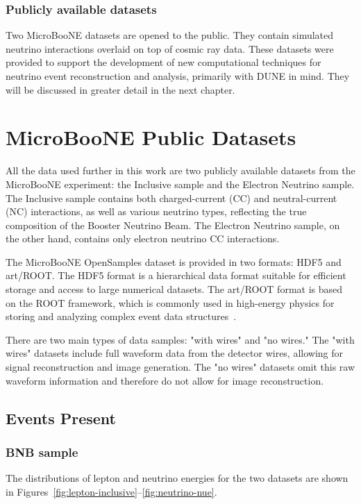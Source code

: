 \documentclass{pracalicmgr}
\begin{document}
\subsection{Publicly available datasets}

Two MicroBooNE datasets are opened to the public. They contain simulated neutrino interactions overlaid on top of cosmic ray data. These datasets were provided to support the development of new computational techniques for neutrino event reconstruction and analysis, primarily with DUNE in mind. They will be discussed in greater detail in the next chapter.

\chapter{MicroBooNE Public Datasets}

All the data used further in this work are two publicly available datasets from the MicroBooNE experiment: the Inclusive sample and the Electron Neutrino sample. The Inclusive sample contains both charged-current (CC) and neutral-current (NC) interactions, as well as various neutrino types, reflecting the true composition of the Booster Neutrino Beam. The Electron Neutrino sample, on the other hand, contains only electron neutrino CC interactions.

The MicroBooNE OpenSamples dataset is provided in two formats: HDF5 and art/ROOT. The HDF5 format is a hierarchical data format suitable for efficient storage and access to large numerical datasets. The art/ROOT format is based on the ROOT framework, which is commonly used in high-energy physics for storing and analyzing complex event data structures~\cite{hdf5,root}. 

There are two main types of data samples: "with wires" and "no wires." The "with wires" datasets include full waveform data from the detector wires, allowing for signal reconstruction and image generation. The "no wires" datasets omit this raw waveform information and therefore do not allow for image reconstruction.

\section{Events Present}

\subsection{BNB sample}

The distributions of lepton and neutrino energies for the two datasets are shown in Figures~\ref{fig:lepton-inclusive}--\ref{fig:neutrino-nue}. 
\end{document}
